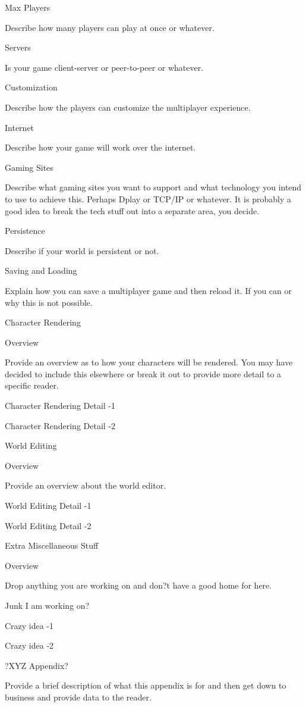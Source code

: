 \documentclass[a4paper]{article}
\begin{document}
Max Players

	Describe how many players can play at once or whatever.

Servers

	Is your game client-server or peer-to-peer or whatever.

Customization

	Describe how the players can customize the multiplayer experience.

Internet

	Describe how your game will work over the internet.

Gaming Sites

	Describe what gaming sites you want to support and what technology you intend to use to achieve this.  Perhaps Dplay or TCP/IP or whatever.  It is probably a good idea to break the tech stuff out into a separate area, you decide.

Persistence

	Describe if your world is persistent or not.

Saving and Loading

	Explain how you can save a multiplayer game and then reload it.  If you can or why this is not possible.

Character Rendering

Overview

	Provide an overview as to how your characters will be rendered.  You may have decided to include this elsewhere or break it out to provide more detail to a specific reader.

Character Rendering Detail -1

Character Rendering Detail -2

World Editing

Overview

	Provide an overview about the world editor.

World Editing Detail -1

World Editing Detail -2

Extra Miscellaneous Stuff

Overview

Drop anything you are working on and don?t have a good home for here.

Junk I am working on?

Crazy idea -1

Crazy idea -2


 ?XYZ Appendix?

	Provide a brief description of what this appendix is for and then get down to business and provide data to the reader.
\end{document}
